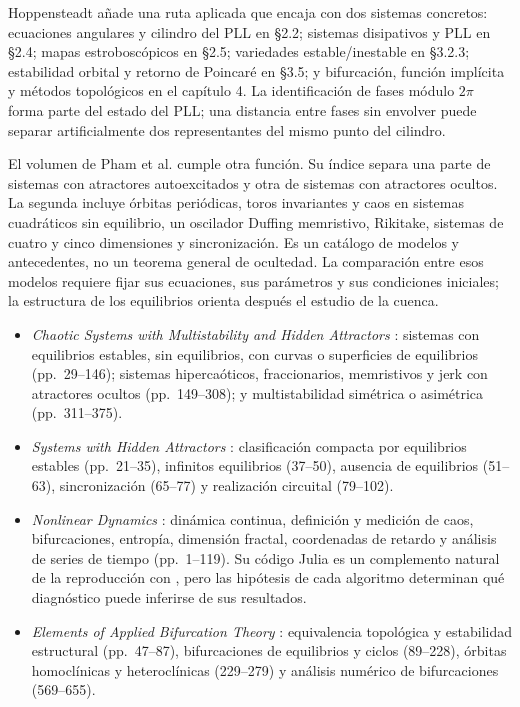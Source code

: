 Hoppensteadt \cite{Hoppensteadt2000Chaotic} añade una ruta aplicada que encaja
con dos sistemas concretos: ecuaciones angulares y cilindro del PLL en
\S2.2; sistemas disipativos y PLL en \S2.4; mapas estroboscópicos en \S2.5;
variedades estable/inestable en \S3.2.3; estabilidad orbital y retorno de
Poincaré en \S3.5; y bifurcación, función implícita y métodos topológicos en el
capítulo 4. La identificación de fases módulo $2\pi$ forma parte del estado del PLL;
una distancia entre fases sin envolver puede separar artificialmente dos
representantes del mismo punto del cilindro.

El volumen de Pham et al. \cite{PhamEtAl2018HiddenAttractors} cumple otra
función. Su índice separa una parte de sistemas con atractores autoexcitados y
otra de sistemas con atractores ocultos. La segunda incluye órbitas
periódicas, toros invariantes y caos en sistemas cuadráticos sin equilibrio,
un oscilador Duffing memristivo, Rikitake, sistemas de cuatro y cinco
dimensiones y sincronización. Es un catálogo de modelos y antecedentes, no un
teorema general de ocultedad. La comparación entre esos modelos requiere fijar sus ecuaciones, sus
parámetros y sus condiciones iniciales; la estructura de los equilibrios
orienta después el estudio de la cuenca.

\begin{itemize}
  \item \emph{Chaotic Systems with Multistability and Hidden Attractors}
        \cite{WangKuznetsovChen2021Multistability}: sistemas con equilibrios
        estables, sin equilibrios, con curvas o superficies de equilibrios
        (pp.\ 29--146); sistemas hipercaóticos, fraccionarios, memristivos y
        jerk con atractores ocultos (pp.\ 149--308); y multistabilidad
        simétrica o asimétrica (pp.\ 311--375).
  \item \emph{Systems with Hidden Attractors}
        \cite{PhamVolosKapitaniak2017Systems}: clasificación compacta por
        equilibrios estables (pp.\ 21--35), infinitos equilibrios (37--50),
        ausencia de equilibrios (51--63), sincronización (65--77) y
        realización circuital (79--102).
  \item \emph{Nonlinear Dynamics} \cite{DatserisParlitz2022Nonlinear}:
        dinámica continua, definición y medición de caos, bifurcaciones,
        entropía, dimensión fractal, coordenadas de retardo y análisis de
        series de tiempo (pp.\ 1--119). Su código Julia es un complemento
        natural de la reproducción con \juliads, pero las hipótesis de cada algoritmo determinan qué diagnóstico puede
        inferirse de sus resultados.
  \item \emph{Elements of Applied Bifurcation Theory}
        \cite{Kuznetsov2023Bifurcation}: equivalencia topológica y estabilidad
        estructural (pp.\ 47--87), bifurcaciones de equilibrios y ciclos
        (89--228), órbitas homoclínicas y heteroclínicas (229--279) y análisis
        numérico de bifurcaciones (569--655).
\end{itemize}

